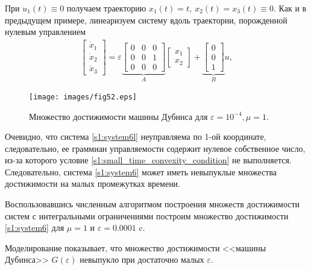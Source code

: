 \documentclass[../main.tex]{subfiles}
\begin{document}
При $  u_1(t) \equiv 0 $ получаем траекторию $ x_1(t) = t, \ x_2(t) = x_3(t) \equiv 0 $.
Как и в предыдущем примере, линеаризуем систему вдоль траектории, порожденной нулевым управлением
\begin{gather}\label{s1:system6l}
     \left[ {\begin{array}{*{20}{c}}
             {{{\dot x}_1}}\\
             {{{\dot x}_2}}\\
             {{{\dot x}_3}}
     \end{array}} \right] = \varepsilon \underbrace {\left[ {\begin{array}{*{20}{c}}
                 0&0&0\\
                 0&0&1\\
                 0&0&0
         \end{array}} \right]}_A\left[ {\begin{array}{*{20}{c}}
             {{x_1}}\\
             {{x_2}}
     \end{array}} \right] + \underbrace {\left[ {\begin{array}{*{20}{c}}
                 0\\
                 0\\
                 1
         \end{array}} \right]}_Bu ,
\end{gather}
\begin{figure}[h]
     \centering
     \texttt{[image: images/fig52.eps]}
     \caption{Множество достижимости машины Дубинса для $\varepsilon = 10^{-4}, \mu = 1$.}
\end{figure}
Очевидно, что система \eqref{s1:system6l} неуправляема по 1-ой координате, следовательно, ее граммиан управляемости содержит нулевое собственное число, из-за которого условие \eqref{s1:small_time_convexity_condition} не выполняется.
Следовательно, система \eqref{s1:system6} может иметь невыпуклые множества достижимости на малых промежутках времени.
 
Воспользовавшись численным алгоритмом построения множеств достижимости систем с интегральными ограничениями \cite{GusevZykov2018} построим множество достижимости \eqref{s1:system6} для $ \mu = 1  $ и $ \varepsilon = 0.0001  $ c. 
 
Моделирование показывает, что множество достижимости <<машины Дубинса>> $G(\varepsilon)$ невыпукло при достаточно малых $ \varepsilon $.
\end{document}
